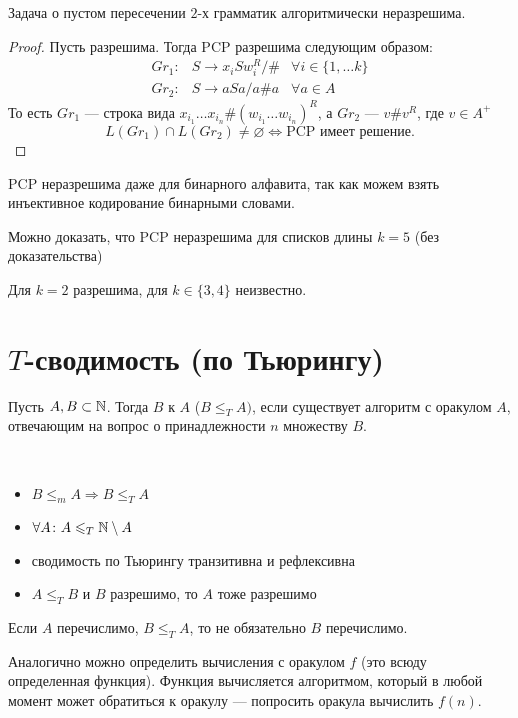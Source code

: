 \begin{cor}
    Задача о пустом пересечении $ 2$-х грамматик алгоритмически неразрешима.
\end{cor}
\begin{proof}
	Пусть разрешима. Тогда  PCP разрешима следующим образом:
	\[
	\begin{aligned}
		Gr_1 \colon& S \to  x_i S w_i^R / \# & \forall i \in \{1, \ldots k\} \\
		Gr_2 \colon& S \to  a S a / a\#a & \forall a \in A
	\end{aligned}
	\]
	То есть $ Gr_1$ --- строка вида $  x_{i_1} \ldots x_{i_n} \# (w_{i_1}\ldots w_{i_{n}})^{R}$, а  $ Gr_2$ --- $ v\#v ^{R}$, где $ v \in A^{+}$
	\[
		L(Gr_1) \cap L(Gr_2) \ne  \varnothing \Longleftrightarrow \text{PCP имеет решение}
	.\] 
\end{proof}

\begin{note}
    PCP неразрешима даже для бинарного алфавита, так как можем взять инъективное кодирование бинарными словами.
\end{note}
\begin{note}
	Можно доказать, что PCP неразрешима для списков длины $ k = 5$ (без доказательства)
\end{note}
\begin{note}
    Для $k= 2$ разрешима, для $ k \in \{3, 4\}$ неизвестно.
\end{note}

\section{$T$-сводимость (по Тьюрингу)}
\begin{defn} 
	Пусть $ A, B \subset \mathbb{N}$. Тогда $ B$  к $ A$ ($ B \le _{T}  A)$, если существует алгоритм с оракулом $ A$, отвечающим на вопрос о принадлежности  $ n $ множеству $ B$.
\end{defn}


\begin{prop}
	~\begin{itemize}
		\item $ B \le _{m} A \Longrightarrow B \le _T A$
		\item $ \forall A\colon  A \leqslant _{T} \mathbb{N} \setminus A $
		\item сводимость по Тьюрингу транзитивна и рефлексивна
		\item $ A \le _{T} B $ и $ B$ разрешимо, то $ A$ тоже разрешимо
    \end{itemize}
\end{prop}
\begin{proof*}
\end{proof*}
\begin{note}
	Если $ A$ перечислимо, $ B \le _{T} A$, то не обязательно $ B$ перечислимо. 
\end{note}


\begin{defn}
	Аналогично можно определить вычисления с оракулом $ f$ (это всюду определенная функция).
	Функция вычисляется алгоритмом, который в любой момент может обратиться к оракулу ---  попросить оракула вычислить $ f(n)$.
\end{defn}
